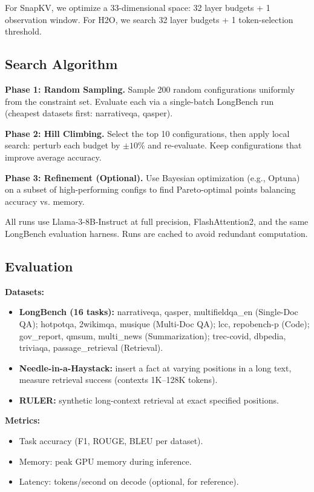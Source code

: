 \documentclass[11pt]{article}
\begin{document}
For SnapKV, we optimize a 33-dimensional space: 32 layer budgets + 1 observation window. For H2O, we search 32 layer budgets + 1 token-selection threshold.

\subsection{Search Algorithm}

\textbf{Phase 1: Random Sampling.}
Sample 200 random configurations uniformly from the constraint set. Evaluate each via a single-batch LongBench run (cheapest datasets first: narrativeqa, qasper).

\textbf{Phase 2: Hill Climbing.}
Select the top 10 configurations, then apply local search: perturb each budget by $\pm 10\%$ and re-evaluate. Keep configurations that improve average accuracy.

\textbf{Phase 3: Refinement (Optional).}
Use Bayesian optimization (e.g., Optuna) on a subset of high-performing configs to find Pareto-optimal points balancing accuracy vs. memory.

All runs use Llama-3-8B-Instruct at full precision, FlashAttention2, and the same LongBench evaluation harness. Runs are cached to avoid redundant computation.

\subsection{Evaluation}

\textbf{Datasets:}
\begin{itemize}
    \item \textbf{LongBench (16 tasks):} narrativeqa, qasper, multifieldqa\_en (Single-Doc QA); hotpotqa, 2wikimqa, musique (Multi-Doc QA); lcc, repobench-p (Code); gov\_report, qmsum, multi\_news (Summarization); trec-covid, dbpedia, triviaqa, passage\_retrieval (Retrieval).
    \item \textbf{Needle-in-a-Haystack:} insert a fact at varying positions in a long text, measure retrieval success (contexts 1K–128K tokens).
    \item \textbf{RULER:} synthetic long-context retrieval at exact specified positions.
\end{itemize}

\textbf{Metrics:}
\begin{itemize}
    \item Task accuracy (F1, ROUGE, BLEU per dataset).
    \item Memory: peak GPU memory during inference.
    \item Latency: tokens/second on decode (optional, for reference).
\end{itemize}
\end{document}
